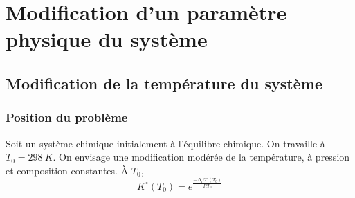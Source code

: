 \documentclass{article}
\newcommand{\Dr}{\Delta_{\mathrm{r}}}
\newcommand{\Tz}{T_0 = \SI{298}{K}}
\begin{document}
\section{Modification d’un paramètre physique du système}
\subsection{Modification de la température du système}
\subsubsection{Position du problème}
Soit un système chimique initialement à l’équilibre chimique. On travaille à $\Tz$. On envisage une modification modérée de la température, à pression et composition constantes. À $T_0$,
$$K^\circ(T_0) = e^{\frac{-\Dr G^\circ(T_0)}{RT_0}}$$
\end{document}
